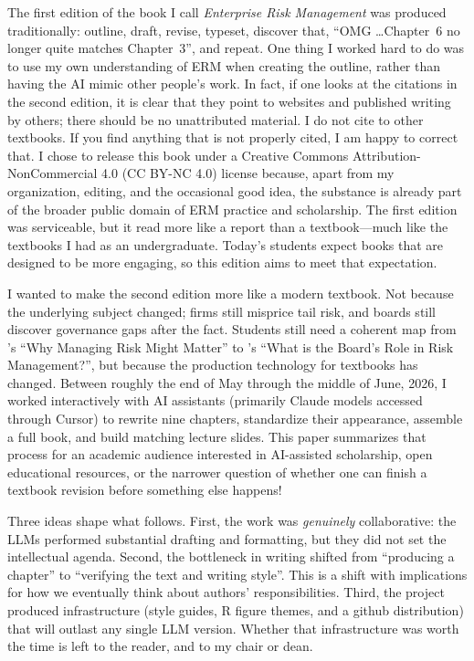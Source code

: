 \documentclass[11pt,letterpaper]{article}
\begin{document}
The first edition of the book I call \textit{Enterprise Risk Management} was produced traditionally: outline, draft, revise, typeset, discover that, ``OMG \ldots Chapter~6 no longer quite matches Chapter~3'', and repeat. One thing I worked hard to do was to use my own understanding of ERM when creating the outline, rather than having the AI mimic other people's work. In fact, if one looks at the citations in the second edition, it is clear that they point to websites and published writing by others; there should be no unattributed material. I do not cite to other textbooks. If you find anything that is not properly cited, I am happy to correct that. I chose to release this book under a Creative Commons Attribution-NonCommercial 4.0 (CC BY-NC 4.0) license because, apart from my organization, editing, and the occasional good idea, the substance is already part of the broader public domain of ERM practice and scholarship. The first edition was serviceable, but it read more like a report than a textbook—much like the textbooks I had as an undergraduate. Today’s students expect books that are designed to be more engaging, so this edition aims to meet that expectation.

I wanted to make the second edition more like a modern textbook. Not because the underlying subject changed; firms still misprice tail risk, and boards still discover governance gaps after the fact. Students still need a coherent map from \cite{froot1993risk}'s ``Why Managing Risk Might Matter'' to \cite{tai2020risk}'s ``What is the Board's Role in Risk Management?'', but because the production technology for textbooks has changed. Between roughly the end of May through the middle of June, 2026, I worked interactively with AI assistants (primarily Claude models accessed through Cursor) to rewrite nine chapters, standardize their appearance, assemble a full book, and build matching lecture slides. This paper summarizes that process for an academic audience interested in AI-assisted scholarship, open educational resources, or the narrower question of whether one can finish a textbook revision before something else happens!

Three ideas shape what follows. First, the work was \emph{genuinely} collaborative: the LLMs performed substantial drafting and formatting, but they did not set the intellectual agenda. Second, the bottleneck in writing shifted from ``producing a chapter'' to ``verifying the text and writing style''. This is a shift with implications for how we eventually think about authors' responsibilities. Third, the project produced infrastructure (style guides, R figure themes, and a github distribution) that will outlast any single LLM version. Whether that infrastructure was worth the time is left to the reader, and to my chair or dean.
\end{document}
